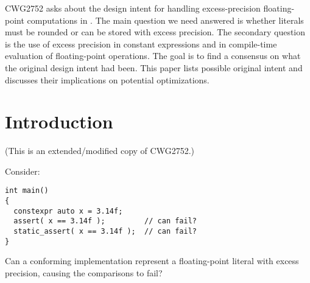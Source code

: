 \newcommand\wgTitle{Floating-Point Excess Precision}
\newcommand\wgName{Matthias Kretz <m.kretz@gsi.de>}
\newcommand\wgDocumentNumber{P3488R0}
\newcommand\wgGroup{SG6, EWG}
\newcommand\wgTarget{\CC{}26}

\usepackage{mymacros}
\usepackage{wg21}
\usepackage{changelog}
\usepackage{underscore}



\renewcommand{\lst}[1]{Listing~\ref{#1}}
\renewcommand{\sect}[1]{Section~\ref{#1}}
\renewcommand{\ttref}[1]{Tony~Table~\ref{#1}}
\newcommand\fp{floating-point\xspace}
\newcommand\Fp{Floating-point\xspace}
\newcommand\discussionref[1]{\hyperref[d:#1]{\color{Headings}$\rightarrow$ Discussion}}


\begin{wgTitlepage}
  CWG2752 asks about the design intent for handling excess-precision
  floating-point computations in \CC{}.
  The main question we need answered is whether literals must be rounded or can
  be stored with excess precision.
  The secondary question is the use of excess precision in constant expressions
  and in compile-time evaluation of floating-point operations.
  The goal is to find a consensus on what the original design intent had been.
  This paper lists possible original intent and discusses their implications on
  potential optimizations.
\end{wgTitlepage}

\pagestyle{scrheadings}




\section{Introduction}

(This is an extended/modified copy of CWG2752.)

Consider:

\begin{lstlisting}
int main()
{
  constexpr auto x = 3.14f;
  assert( x == 3.14f );         // can fail?
  static_assert( x == 3.14f );  // can fail?
}
\end{lstlisting}

Can a conforming implementation represent a floating-point literal with excess
precision, causing the comparisons to fail?

